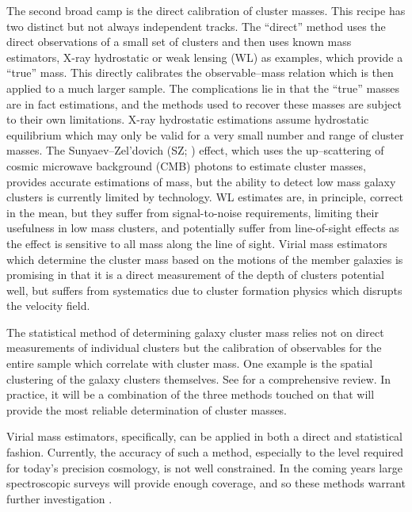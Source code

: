 \documentclass[12pt]{article}
\begin{document}
The second broad camp is the direct calibration of cluster masses. This recipe has two distinct but not always independent tracks. The ``direct'' method uses the direct observations of a small set of clusters and then uses known mass estimators, X-ray hydrostatic or weak lensing (WL) as examples, which provide a ``true'' mass. This directly calibrates the observable--mass relation which is then applied to a much larger sample. The complications lie in that the ``true'' masses are in fact estimations, and the methods used to recover these masses are subject to their own limitations. X-ray hydrostatic estimations assume hydrostatic equilibrium which may only be valid for a very small number and range of cluster masses. The Sunyaev--Zel’dovich (SZ; \citealt{Sunyaev1972}) effect, which uses the up--scattering of cosmic microwave background (CMB) photons to estimate cluster masses, provides accurate estimations of mass, but the ability to detect low mass galaxy clusters is currently limited by technology. WL estimates are, in principle, correct in the mean, but they suffer from signal-to-noise requirements, limiting their usefulness in low mass clusters, and potentially suffer from line-of-sight effects as the effect is sensitive to all mass along the line of sight. Virial mass estimators which determine the cluster mass based on the motions of the member galaxies is promising in that it is a direct measurement of the depth of clusters potential well, but suffers from systematics due to cluster formation physics which disrupts the velocity field.
 
The statistical method of determining galaxy cluster mass relies not on direct measurements of individual clusters but the calibration of observables for the entire sample which correlate with cluster mass. One example is the spatial clustering of the galaxy clusters themselves. See \cite{Weinberg2013} for a comprehensive review. In practice, it will be a combination of the three methods touched on that will provide the most reliable determination of cluster masses. 

Virial mass estimators, specifically, can be applied in both a direct and statistical fashion. Currently, the accuracy of such a method, especially to the level required for today's precision cosmology, is not well constrained. In the coming years large spectroscopic surveys will provide enough coverage, and so these methods warrant further investigation .
\end{document}
